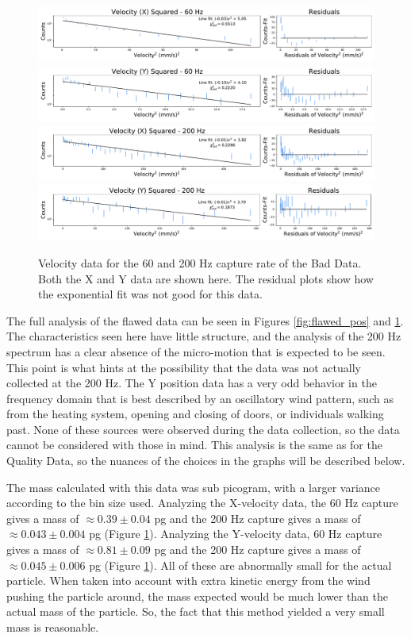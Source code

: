 \documentclass[12pt]{article}
\begin{document}
\begin{figure}[!ht]
\centering
    \includegraphics[width=\textwidth]{data_33_x_vel.pdf}
    \includegraphics[width=\textwidth]{data_33_y_vel.pdf}
    \includegraphics[width=\textwidth]{data_36_x_vel.pdf}
    \includegraphics[width=\textwidth]{data_36_y_vel.pdf}
	\caption{Velocity data for the 60 and 200 Hz capture rate of the Bad Data. Both the X and Y data are shown here. The residual plots show how the exponential fit was not good for this data.}
    \label{fig:flawed_vel}
\end{figure}

The full analysis of the flawed data can be seen in Figures \ref{fig:flawed_pos} and \ref{fig:flawed_vel}. The characteristics seen here have little structure, and the analysis of the 200 Hz spectrum has a clear absence of the micro-motion that is expected to be seen. This point is what hints at the possibility that the data was not actually collected at the 200 Hz. The Y position data has a very odd behavior in the frequency domain that is best described by an oscillatory wind pattern, such as from the heating system, opening and closing of doors, or individuals walking past. None of these sources were observed during the data collection, so the data cannot be considered with those in mind. This analysis is the same as for the Quality Data, so the nuances of the choices in the graphs will be described below.

The mass calculated with this data was sub picogram, with a larger variance according to the bin size used. Analyzing the X-velocity data, the 60 Hz capture gives a mass of $\approx 0.39 \pm 0.04$ pg and the 200 Hz capture gives a mass of $\approx 0.043 \pm 0.004$ pg (Figure \ref{fig:flawed_vel}). Analyzing the Y-velocity data, 60 Hz capture gives a mass of $\approx 0.81 \pm 0.09$ pg and the 200 Hz capture gives a mass of $\approx 0.045 \pm 0.006$ pg (Figure \ref{fig:flawed_vel}). All of these are abnormally small for the actual particle. When taken into account with extra kinetic energy from the wind pushing the particle around, the mass expected would be much lower than the actual mass of the particle. So, the fact that this method yielded a very small mass is reasonable.
\end{document}
